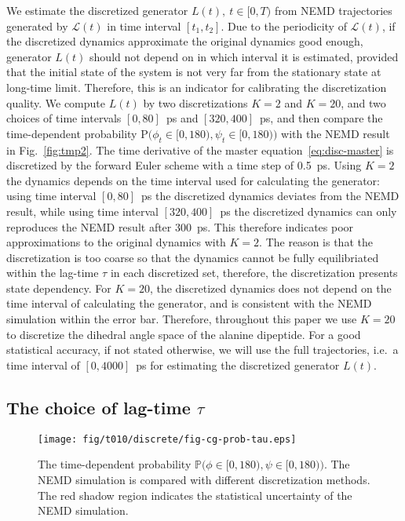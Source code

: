 \documentclass[aps, pre, preprint,unsortedaddress,a4paper,onecolumn]{revtex4}
\newcommand{\ml}[0]{\mathcal {L}}
\newcommand{\prob}{\textrm{P}}
\begin{document}
We estimate the discretized generator $L(t), \ t\in[0,T)$
from NEMD trajectories generated by $\ml(t)$ in time interval $[t_1,
t_2]$.
Due to the periodicity of $\ml(t)$, if the discretized dynamics approximate the original
dynamics good enough, generator  $L(t)$ should not depend on in which interval
it is estimated, provided that the initial state of the system
is not very far from the stationary state at long-time limit.
Therefore, this is an indicator for calibrating the discretization quality.
We compute $L(t)$ by two discretizations $K=2$ and $K=20$, and two
choices of time intervals $[0, 80]$~ps and $[320, 400]$~ps, and then
compare the time-dependent
probability $\prob\big(\phi_t\in[0,180), \psi_t\in [0,180)\big)$
with the NEMD result in
Fig.~\ref{fig:tmp2}.
The time derivative of the master equation~\eqref{eq:disc-master}
is discretized by the forward Euler scheme with a time step of 0.5~ps.
Using $K=2$ the dynamics depends on the time interval used for
calculating the generator: using time interval $[0, 80]$~ps the discretized
dynamics deviates from the NEMD result,
while using time interval $[320, 400]$~ps the discretized dynamics can only
reproduces the NEMD result after 300~ps.  This therefore indicates poor 
approximations to the original dynamics with $K=2$. The reason is that the
discretization is too coarse so that the dynamics cannot be fully
equilibriated within the lag-time $\tau$ in each discretized set,
therefore, the discretization presents state dependency.  For
$K=20$, the discretized dynamics does not depend on the time interval of
calculating the generator, and is consistent with the
NEMD simulation within the error bar. Therefore, throughout this paper we use $K=20$
to discretize  the dihedral angle space of the alanine dipeptide.
For a good statistical accuracy, if not stated otherwise,
we will use the full trajectories, i.e.~a time interval of
$[0,4000]$~ps for estimating the discretized generator $L(t)$.


\subsection{The choice of lag-time $\tau$}
\label{sec:alanine-tau}

\begin{figure}
  \centering
  \texttt{[image: fig/t010/discrete/fig-cg-prob-tau.eps]}  
  \caption{The time-dependent probability $\mathbb
    P\big(\phi\in[0,180), \psi\in [0,180)\big)$.  The NEMD simulation is compared with different
    discretization methods. The red shadow region indicates the
    statistical uncertainty of the NEMD simulation.}
  \label{fig:tmp3}
\end{figure}
\end{document}
